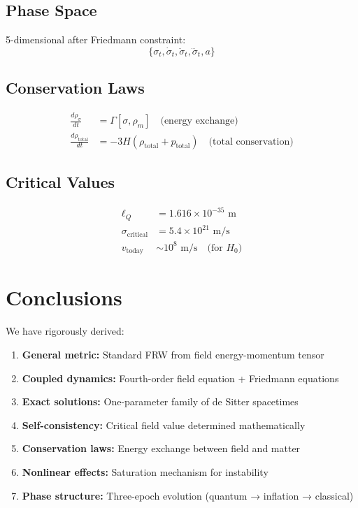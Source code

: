 \documentclass[11pt,a4paper]{article}
\theoremstyle{definition}
\theoremstyle{remark}
\begin{document}
	\subsection{Phase Space}
	
	5-dimensional after Friedmann constraint:
	\begin{equation}
		\{\sigma_t, \dot{\sigma}_t, \ddot{\sigma}_t, \dddot{\sigma}_t, a\}
	\end{equation}
	
	\subsection{Conservation Laws}
	
	\begin{align}
		\frac{d\rho_\sigma}{dt} &= \Gamma[\sigma, \rho_m] \quad \text{(energy exchange)}\\
		\frac{d\rho_{\text{total}}}{dt} &= -3H(\rho_{\text{total}} + p_{\text{total}}) \quad \text{(total conservation)}
	\end{align}
	
	\subsection{Critical Values}
	
	\begin{align}
		\ell_Q &= 1.616 \times 10^{-35} \text{ m}\\
		\sigma_{\text{critical}} &= 5.4 \times 10^{21} \text{ m/s}\\
		v_{\text{today}} &\sim 10^8 \text{ m/s} \quad \text{(for } H_0)
	\end{align}
	
	\section{Conclusions}
	
	We have rigorously derived:
	
	\begin{enumerate}
		\item \textbf{General metric:} Standard FRW from field energy-momentum tensor
		\item \textbf{Coupled dynamics:} Fourth-order field equation + Friedmann equations
		\item \textbf{Exact solutions:} One-parameter family of de Sitter spacetimes
		\item \textbf{Self-consistency:} Critical field value determined mathematically
		\item \textbf{Conservation laws:} Energy exchange between field and matter
		\item \textbf{Nonlinear effects:} Saturation mechanism for instability
		\item \textbf{Phase structure:} Three-epoch evolution (quantum → inflation → classical)
	\end{enumerate}
	
\end{document}
